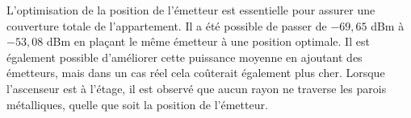 L'optimisation de la position de l'émetteur est essentielle pour assurer une couverture totale de l'appartement. Il a été possible de passer de $-69,65$ dBm à $-53,08$ dBm en plaçant le même émetteur à une position optimale. %
Il est également possible d'améliorer cette puissance moyenne en ajoutant des émetteurs, mais dans un cas réel cela coûterait également plus cher. Lorsque l'ascenseur est à l'étage, il est observé que aucun rayon ne traverse les parois métalliques, quelle que soit la position de l'émetteur.